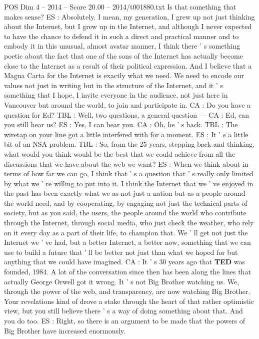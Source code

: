 \begin{textsample}{POS Dim 4 – 2014 – Score 20.00 – 2014/t001880.txt}
Is that something that makes sense?
ES : Absolutely.
I mean, my generation, I grew up not just thinking about the Internet, but I grew up in the Internet, and although I never expected to have the chance to defend it in such a direct and practical manner and to embody it in this unusual, almost avatar manner, I think there ' s something poetic about the fact that one of the sons of the Internet has actually become close to the Internet as a result of their political expression.
And I believe that a Magna Carta for the Internet is exactly what we need.
We need to encode our values not just in writing but in the structure of the Internet, and it ' s something that I hope, I invite everyone in the audience, not just here in Vancouver but around the world, to join and participate in.
CA : Do you have a question for Ed?
TBL : Well, two questions, a general question — CA : Ed, can you still hear us?
ES : Yes, I can hear you.
CA : Oh, he ' s back.
TBL : The wiretap on your line got a little interfered with for a moment.
ES : It ' s a little bit of an NSA problem.
TBL : So, from the 25 years, stepping back and thinking, what would you think would be the best that we could achieve from all the discussions that we have about the web we want?
ES : When we think about in terms of how far we can go, I think that ' s a question that ' s really only limited by what we ' re willing to put into it.
I think the Internet that we ' ve enjoyed in the past has been exactly what we as not just a nation but as a people around the world need, and by cooperating, by engaging not just the technical parts of society, but as you said, the users, the people around the world who contribute through the Internet, through social media, who just check the weather, who rely on it every day as a part of their life, to champion that.
We ' ll get not just the Internet we ' ve had, but a better Internet, a better now, something that we can use to build a future that ' ll be better not just than what we hoped for but anything that we could have imagined.
CA : It ' s 30 years ago that \textbf{TED} was founded, 1984.
A lot of the conversation since then has been along the lines that actually George Orwell got it wrong.
It ' s not Big Brother watching us.
We, through the power of the web, and transparency, are now watching Big Brother.
Your revelations kind of drove a stake through the heart of that rather optimistic view, but you still believe there ' s a way of doing something about that.
And you do too.
ES : Right, so there is an argument to be made that the powers of Big Brother have increased enormously.

\end{textsample}
